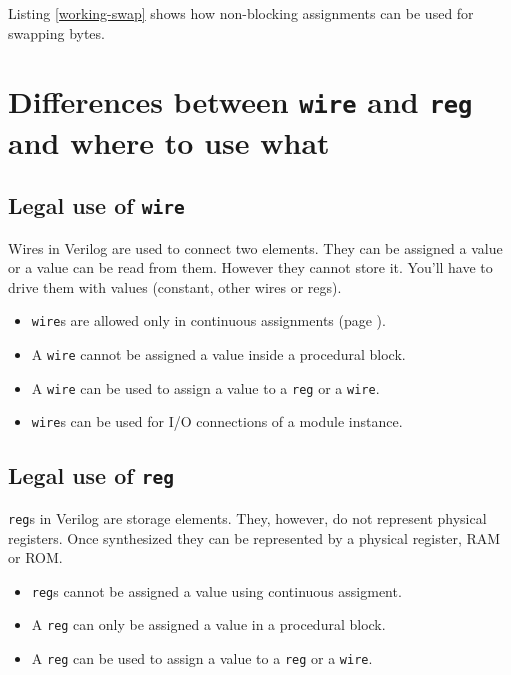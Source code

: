 \documentclass[a4paper,10pt]{article}
\theoremstyle{mytheor}
\newcommand{
  \insertverilog}[3]{
  
}
\begin{document}
Listing \ref{working-swap} shows how non-blocking assignments can be
used for swapping bytes.

\insertverilog{./verilog_files/workingSwap.v}{working-swap}{Swapping bytes using non-blocking assignment\, it works!}   

\section{Differences between \lstinline[style=verilog-inline-style]{wire} and \lstinline[style=verilog-inline-style]{reg} and where to use what}
\subsection{Legal use of \lstinline[style=verilog-inline-style]{wire}}
Wires in Verilog are used to connect two elements. They can be
assigned a value or a value can be read from them. However they cannot
store it. You'll have to drive them with values (constant, other wires
or regs).

\begin{itemize}
\item \lstinline[style=verilog-inline-style]{wire}s are allowed only
  in continuous assignments (page \pageref{continuous-assignment}).
\item A \lstinline[style=verilog-inline-style]{wire} cannot be
  assigned a value inside a procedural block.
\item A \lstinline[style=verilog-inline-style]{wire} can be used to
  assign a value to a \lstinline[style=verilog-inline-style]{reg} or a
  \lstinline[style=verilog-inline-style]{wire}.
\item \lstinline[style=verilog-inline-style]{wire}s can be used for I/O connections of a module instance.
\end{itemize}

\subsection{Legal use of \lstinline[style=verilog-inline-style]{reg}}
\lstinline[style=verilog-inline-style]{reg}s in Verilog are storage
elements. They, however, do not represent physical registers. Once
synthesized they can be represented by a physical register, RAM or
ROM.

 \begin{itemize}
 \item \lstinline[style=verilog-inline-style]{reg}s cannot be assigned
   a value using continuous assigment.
 \item A \lstinline[style=verilog-inline-style]{reg} can only be
   assigned a value in a procedural block.
 \item A \lstinline[style=verilog-inline-style]{reg} can be used to
   assign a value to a \lstinline[style=verilog-inline-style]{reg} or
   a \lstinline[style=verilog-inline-style]{wire}.
\end{itemize}
\end{document}
